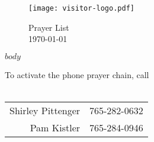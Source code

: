 \documentclass[14pt,letterpaper]{extarticle}
\begin{document}
   
  

\begin{figure}[ht]
{\begin{minipage}[t]{.5in}
\vspace{0in}\texttt{[image: visitor-logo.pdf]}
\end{minipage}}
{\begin{minipage}[t]{3in}
\vspace{0in} \fontsize{20}{15}\selectfont Prayer List \\
\fontsize{12}{9}\textsc{\prayerlistdate \today}
\end{minipage}}
\end{figure}      

$body$

\vspace{.5in}   


\begin{table}[htbp]   
  \centering
  To activate the phone prayer chain, call \\ \ \\
\begin{tabular}{|rl|}
Shirley Pittenger & 765-282-0632 \\
Pam Kistler & 765-284-0946\\
\end{tabular}
\end{table}        
\end{document}
